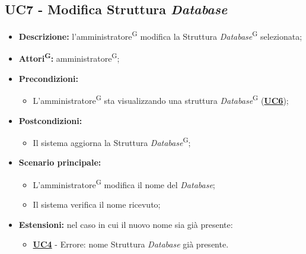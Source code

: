 \subsection{UC7 - Modifica Struttura \textit{Database}}
\label{sec:UC7}
\begin{itemize}
	\item \textbf{Descrizione:} l’amministratore\textsuperscript{G} modifica la Struttura \textit{Database}\textsuperscript{G} selezionata;
	\item \textbf{Attori\textsuperscript{G}:} amministratore\textsuperscript{G};
	\item \textbf{Precondizioni:} 
	\begin{itemize}
		\item L’amministratore\textsuperscript{G} sta visualizzando una struttura \textit{Database}\textsuperscript{G} (\hyperref[sec:UC6]{\textbf{UC6}});
	\end{itemize}
	\item \textbf{Postcondizioni:} 
	\begin{itemize}
		\item Il sistema aggiorna la Struttura \textit{Database}\textsuperscript{G};
	\end{itemize}
	\item \textbf{Scenario principale:} 
	\begin{itemize}
		\item L’amministratore\textsuperscript{G} modifica il nome del \textit{Database};
		\item Il sistema verifica il nome ricevuto;
	\end{itemize}
	\item \textbf{Estensioni:} nel caso in cui il nuovo nome sia già presente:
	\begin{itemize}
		\item \hyperref[sec:UC4]{\textbf{UC4}} - Errore: nome Struttura \textit{Database} già presente.
	\end{itemize}
\end{itemize}

